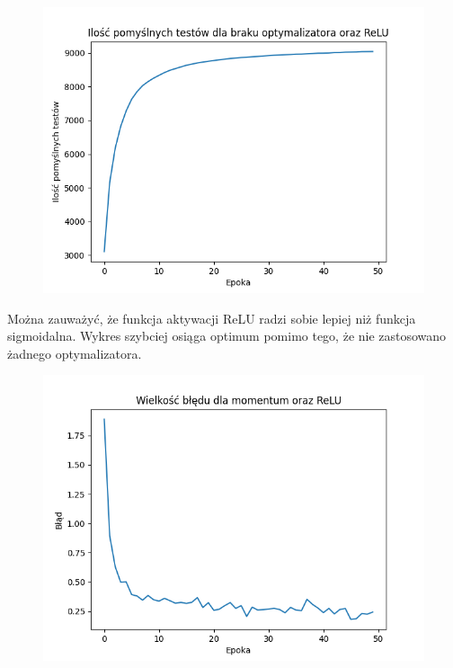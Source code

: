 \documentclass{article}
\begin{document}
\begin{figure}[!htb]
  \centering
  \includegraphics[width=\linewidth]{test_none_ReLU.png}
\end{figure}

Można zauważyć, że funkcja aktywacji ReLU radzi sobie lepiej niż funkcja sigmoidalna. Wykres szybciej osiąga 
optimum pomimo tego, że nie zastosowano żadnego optymalizatora.

\begin{figure}[!htb]
  \centering
  \includegraphics[width=\linewidth]{error_momentum_ReLU.png}
\end{figure}
\end{document}
